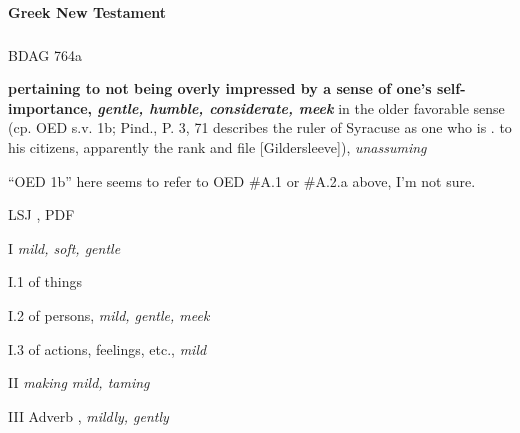 			
		\paragraph{Greek New Testament} %
			\label{MEEKNESS-GREEK}
		
			\subparagraph{\texorpdfstring{}{}}
				\label{PRAUS}
			
				\begin{compactdesc}
					\item[BDAG 764a] \textbf{}
						\begin{compactitem}
							\item \textbf{pertaining to not being overly impressed by a sense of one's self-importance, \textit{gentle, humble, considerate, meek}} in the older favorable sense (cp. OED s.v. 1b; Pind., P. 3, 71 describes the ruler of Syracuse as one who is . to his citizens, apparently the rank and file [Gildersleeve]), \textit{unassuming}
								\begin{compactitem}
									\item ``OED 1b'' here seems to refer to OED \#A.1 or \#A.2.a above, I'm not sure.
								\end{compactitem}
						\end{compactitem}
					\item[LSJ , PDF ] \textbf{}
						\begin{compactitem}
							\item[I] \textit{mild, soft, gentle}
							\item[I.1] of things
							\item[I.2] of persons, \textit{mild, gentle, meek}
							\item[I.3] of actions, feelings, etc., \textit{mild}
							\item[II] \textit{making mild, taming}
							\item[III] Adverb , \textit{mildly, gently}
						\end{compactitem}
						

\end{compactdesc}
